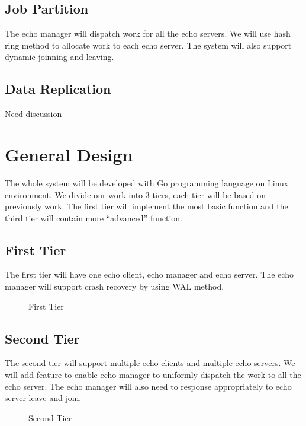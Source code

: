 \documentclass[12pt]{article}
\begin{document}
\subsection{Job Partition}
The echo manager will dispatch work for all the echo servers. We will use hash ring
method to allocate work to each echo server. The system will also support dynamic
joinning and leaving.
\subsection{Data Replication}
Need discussion

\section{General Design}
The whole system will be developed with Go programming language on Linux 
environment. We divide our work into 3 tiers, each tier will be based on previously work. The first tier will implement the most basic function and the third tier will contain more ``advanced'' function.

\subsection{First Tier}
The first tier will have one echo client, echo manager and echo server. The
echo manager will support crash recovery by using WAL method.  
\begin{figure}[H]
\caption{First Tier}
\label{fig:speciation}
\end{figure}

\subsection{Second Tier}
The second tier will support multiple echo clients and multiple echo servers. 
We will add feature to enable echo manager to uniformly dispatch the work 
to all the echo server. The echo manager will also need to response appropriately 
to echo server leave and join.
\begin{figure}[H]
\caption{Second Tier}
\label{fig:speciation}
\end{figure}
\end{document}
